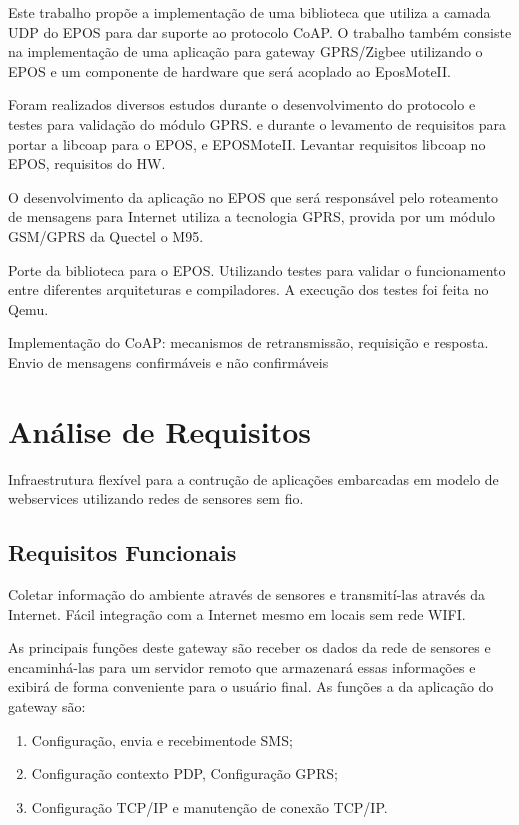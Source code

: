 Este trabalho prop\~oe a implementa\c{c}\~ao de uma biblioteca que utiliza a camada UDP do EPOS para dar suporte ao protocolo CoAP. O trabalho tamb\'em consiste na implementa\c{c}\~ao de uma aplica\c{c}\~ao para gateway GPRS/Zigbee utilizando o EPOS e um componente de hardware que ser\'a acoplado ao EposMoteII.

Foram realizados diversos estudos durante o desenvolvimento do protocolo e testes para valida\c{c}\~ao do m\'odulo GPRS. e durante o levamento de requisitos para portar a libcoap para o EPOS, e EPOSMoteII. Levantar requisitos libcoap no EPOS, requisitos do HW.

O desenvolvimento da aplica\c{c}\~ao no EPOS que ser\'a respons\'avel pelo roteamento de mensagens para Internet utiliza a tecnologia GPRS, provida por um m\'odulo GSM/GPRS da Quectel o M95.

Porte da biblioteca para o EPOS. Utilizando testes para validar o funcionamento entre diferentes arquiteturas e compiladores. A execu\c{c}\~ao dos testes foi feita no Qemu.

Implementa\c{c}\~ao do CoAP: mecanismos de retransmiss\~ao, requisi\c{c}\~ao e resposta. Envio de mensagens confirm\'aveis e n\~ao confirm\'aveis

\section{An\'alise de Requisitos}
Infraestrutura flex\'ivel para a contru\c{c}\~ao de aplica\c{c}\~oes embarcadas em modelo de webservices utilizando redes de sensores sem fio.
\subsection{Requisitos Funcionais}{
Coletar informa\c{c}\~ao do ambiente atrav\'es de sensores e transmit\'i-las atrav\'es da Internet. F\'acil integra\c{c}\~ao com a Internet mesmo em locais sem rede WIFI.

As principais fun\c{c}\~oes deste gateway s\~ao receber os dados da rede de sensores e encaminh\'a-las para um servidor remoto que armazenar\'a essas informa\c{c}\~oes e exibir\'a de forma conveniente para o usu\'ario final.
As fun\c{c}\~oes a da aplica\c{c}\~ao do gateway s\~ao:
\begin{enumerate}
    \item Configura\c{c}\~ao, envia e recebimentode SMS;
    \item Configura\c{c}\~ao contexto PDP, Configura\c{c}\~ao GPRS;
    \item Configura\c{c}\~ao TCP/IP e manuten\c{c}\~ao de conex\~ao TCP/IP.
\end{enumerate}
}

